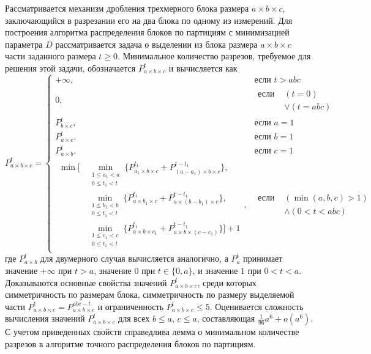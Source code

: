 \documentclass[a4paper,14pt]{extarticle}                     %
\theoremstyle{plain}                                         %
\begin{document}
Рассматривается механизм дробления трехмерного блока размера $a \times b \times c$, заключающийся в разрезании его на два блока по одному из измерений.
Для построения алгоритма распределения блоков по партициям с минимизацией параметра $D$ рассматривается задача о выделении из блока размера $a \times b \times c$ части заданного размера $t \ge 0$.
Минимальное количество разрезов, требуемое для решения этой задачи, обозначается $P_{a \times b \times c}^t$ и вычисляется как
\begin{equation}\label{eqn:par_pnmkt_3d}
P_{a \times b \times c}^t =
	\begin{cases}
		+\infty, & \text{если } t > abc \\
		0, & 
			\begin{aligned}
				\text{если } & (t = 0) \\[-4pt]
				& \vee (t = abc)
			\end{aligned} \\
		P_{b \times c}^t, & \text{если } a = 1 \\
		P_{a \times c}^t, & \text{если } b = 1 \\
		P_{a \times b}^t, & \text{если } c = 1 \\
		\begin{aligned}
			\min\big[
				& \min_{\substack{1 \le a_1 < a \\ 0 \le t_1 < t}}{\{P_{a_1 \times b \times c}^{t_1} + P_{(a - a_1) \times b \times c}^{t - t_1}\}}, \\[-2pt]
				& \min_{\substack{1 \le b_1 < b \\ 0 \le t_1 < t}}{\{P_{a \times b_1 \times c}^{t_1} + P_{a \times (b - b_1) \times c}^{t - t_1}\}}, \\[-2pt]
				& \min_{\substack{1 \le c_1 < c \\ 0 \le t_1 < t}}{\{P_{a \times b \times c_1}^{t_1} + P_{a \times b \times (c - c_1)}^{t - t_1}\}}
			\big] + 1
		\end{aligned}, & 
			\begin{aligned}
				\text{если } & (\min(a, b, c) > 1) \\[-4pt]
				& \wedge (0 < t < abc)
			\end{aligned}
	\end{cases}
\end{equation}
где $P_{a \times b}^t$ для двумерного случая вычисляется аналогично, а $P_a^t$ принимает значение $+\infty$ при $t > a$, значение $0$ при $t \in \{0, a\}$, и значение $1$ при $0 < t < a$.
Доказываются основные свойства значений $P_{a \times b \times c}^t$, среди которых симметричность по размерам блока, симметричность по размеру выделяемой части $P_{a \times b \times c}^t = P_{a \times b \times c}^{abc - t}$ и ограниченность $P_{a \times b \times c}^t \le 5$.
Оценивается сложность вычисления значений $P_{a \times b \times c}^t$ для всех $b \le a$, $c \le a$, составляющая $\frac{1}{96}a^6 + o(a^6)$.
С учетом приведенных свойств справедлива лемма о минимальном количестве разрезов в алгоритме точного распределения блоков по партициям.
\end{document}
